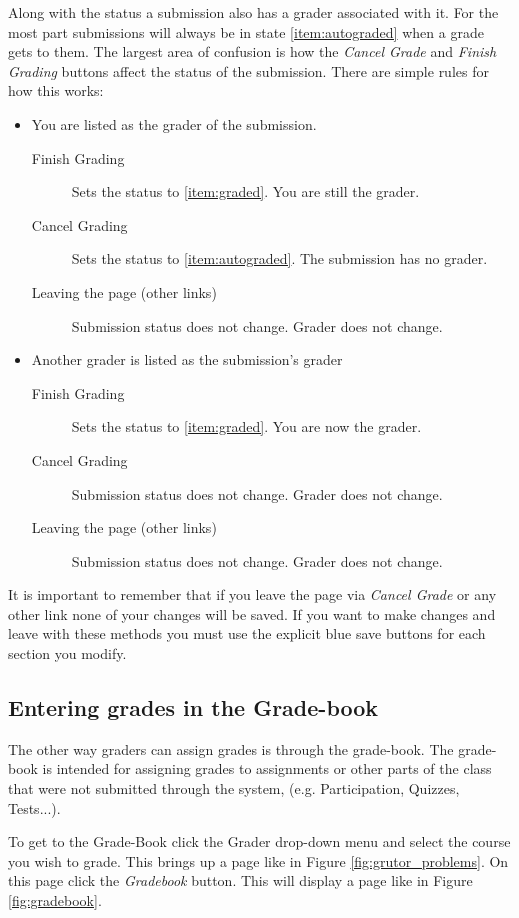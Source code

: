 \documentclass[11pt]{report}
\begin{document}
Along with the status a submission also has a grader associated with it. For the most part submissions will always 
be in state \ref{item:autograded} when a grade gets to them. 
The largest area of confusion is how the \emph{Cancel Grade} and \emph{Finish Grading} buttons affect the
status of the submission. There are simple rules for how this works:
\begin{itemize}
\item You are listed as the grader of the submission.
\begin{description}
\item[Finish Grading] Sets the status to \ref{item:graded}. You are still the grader.
\item[Cancel Grading] Sets the status to \ref{item:autograded}. The submission has no grader.
\item[Leaving the page (other links)] Submission status does not change. Grader does not change.
\end{description}
\item Another grader is listed as the submission's grader
\begin{description}
\item[Finish Grading] Sets the status to \ref{item:graded}. You are now the grader.
\item[Cancel Grading] Submission status does not change. Grader does not change.
\item[Leaving the page (other links)] Submission status does not change. Grader does not change.
\end{description}
\end{itemize}

It is important to remember that if you leave the page via \emph{Cancel Grade} or any other link
none of your changes will be saved. If you want to make changes and leave with these methods you must
use the explicit blue save buttons for each section you modify.

\subsection{Entering grades in the Grade-book}
The other way graders can assign grades is through the grade-book. The grade-book is intended for assigning
grades to assignments or other parts of the class that were not submitted through the system, (e.g. 
Participation, Quizzes, Tests...).

To get to the Grade-Book click the Grader drop-down menu and select the course you wish to grade. This
brings up a page like in Figure \ref{fig:grutor_problems}. On this page click the \emph{Gradebook} button.
This will display a page like in Figure \ref{fig:gradebook}.
\end{document}
